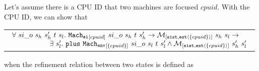 \begin{lemma}
\label{lemma:chapter:conlink:one-step-single-refines-env}
Let's assume  there is a CPU ID that two machines are focused $cpuid$. With the CPU ID, we can show that
\begin{center}
\begin{tabular}{P{0.95\textwidth}}
$
\begin{array}{l}
\forall \ si\_o \ s_h \ s_h' \ t \ s_l . \ \singlestep{cpuid}{si\_o}{s_h}{t}{s_h'} \rightarrow  \matchsinglestatestate{\set{cpuid}}{s_h}{s_l} \rightarrow \\
\ \ \ \ \ \ \ \ \ \ \ \ \ \ \ \ \exists\ s_l' . \  \ccplusstep{\envstep{\set{cpuid}}{si\_o}{s_l}{t}{s_l'}} \wedge  \matchsinglestatestate{\set{cpuid}}{s_h'}{s_l'}\\
\end{array}
$
\end{tabular}
\end{center}
when the refinement relation between two states is defined as
\begin{mathpar}
\end{mathpar}
\end{lemma}

